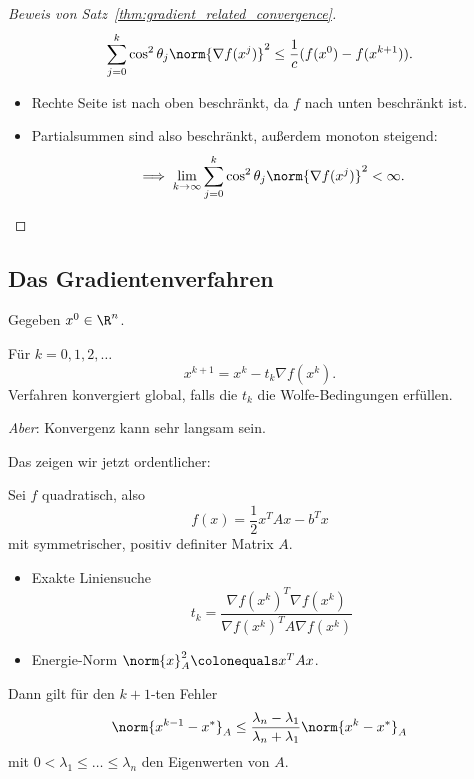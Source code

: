 \begin{proof}[Beweis von Satz~\ref{thm:gradient_related_convergence}]
\begin{equation*}
    \sum_{j=0}^k \cos^2 \theta_j \norm{\nabla f(x^j)}^2 \leq \frac{1}{c} (f (x^0 )-f (x^{k+1} ) ).
\end{equation*}
\begin{itemize}
 \item Rechte Seite ist nach oben beschränkt, da $f$ nach unten beschränkt ist.
 \item Partialsummen sind also beschränkt, außerdem monoton steigend:
 \begin{equation*}
  \implies \lim_{k \to \infty} \sum_{j=0}^k \cos^2 \theta_j \norm{ \nabla f (x^j)}^2 <\infty.
  \qedhere
\end{equation*}
\end{itemize}
\end{proof}


\subsection{Das Gradientenverfahren}

Gegeben $x^0 \in \R^n$.

Für $k=0,1,2,\ldots$
\begin{equation*}
 x^{k+1} = x^k-t_k \nabla f(x^k).
\end{equation*}
Verfahren konvergiert global, falls die $t_k$ die Wolfe-Bedingungen erfüllen.

\medskip

\emph{Aber}: Konvergenz kann sehr langsam sein.

\medskip

Das zeigen wir jetzt ordentlicher:

\begin{satz}
Sei $f$ quadratisch, also
\begin{equation*}
 f(x)=\frac{1}{2}x^TAx-b^Tx
\end{equation*}
mit symmetrischer, positiv definiter Matrix $A$.
\begin{itemize}
 \item Exakte Liniensuche
  \begin{equation*}
   t_k=\frac{\nabla f(x^k)^T \nabla f(x^k)}{\nabla f(x^k)^TA \nabla f(x^k)}
  \end{equation*}
 \item Energie-Norm $\norm{x}_A^2 \colonequals x^TAx$.
\end{itemize}
Dann gilt für den $k+1$-ten Fehler
\begin{equation*}
 \norm{x^{k-1}-x^*}_A \leq \frac{\lambda_n-\lambda_1}{\lambda_n+\lambda_1} \norm{x^k-x^*}_A
\end{equation*}
mit $0<\lambda_1 \leq \ldots \leq \lambda_n$ den Eigenwerten von $A$.
\end{satz}

